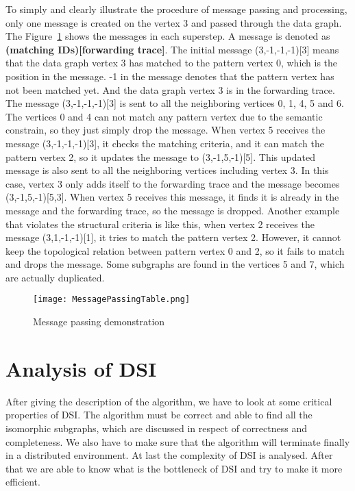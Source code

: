 To simply and clearly illustrate the procedure of message passing and processing, only one message is created on the vertex 3 and passed through the data graph. The Figure~\ref{fig:MessagePassingDemo} shows the messages in each superstep. A message is denoted as \textbf{(matching IDs)[forwarding trace]}. The initial message (3,-1,-1,-1)[3] means that the data graph vertex 3 has matched to the pattern vertex 0, which is the position in the message. -1 in the message denotes that the pattern vertex has not been matched yet. And the data graph vertex 3 is in the forwarding trace. The message (3,-1,-1,-1)[3] is sent to all the neighboring vertices 0, 1, 4, 5 and 6.  The vertices 0 and 4 can not match any pattern vertex due to the semantic constrain, so they just simply drop the message. When vertex 5 receives the message (3,-1,-1,-1)[3], it checks the matching criteria, and it can match the pattern vertex 2, so it updates the message to (3,-1,5,-1)[5]. This updated message is also sent to all the neighboring vertices including vertex 3. In this case, vertex 3 only adds itself to the forwarding trace and the message becomes (3,-1,5,-1)[5,3]. When vertex 5 receives this message, it finds it is already in the message and the forwarding trace, so the message is dropped. Another example that violates the structural criteria is like this, when vertex 2 receives the message (3,1,-1,-1)[1], it tries to match the pattern vertex 2. However, it cannot keep the topological relation between pattern vertex 0 and 2, so it fails to match and drops the message. Some subgraphs are found in the vertices 5 and 7, which are actually duplicated.

\begin{figure}[H]
  \begin{center}
    \texttt{[image: MessagePassingTable.png]}
    \caption{Message passing demonstration}
    \label{fig:MessagePassingDemo}
  \end{center}
\end{figure}

\section{Analysis of DSI}
After giving the description of the algorithm, we have to look at some critical properties of DSI. The algorithm must be correct and able to find all the isomorphic subgraphs, which are discussed in respect of correctness and completeness. We also have to make sure that the algorithm will terminate finally in a distributed environment. At last the complexity of DSI is analysed. After that we are able to know what is the bottleneck of DSI and try to make it more efficient.

